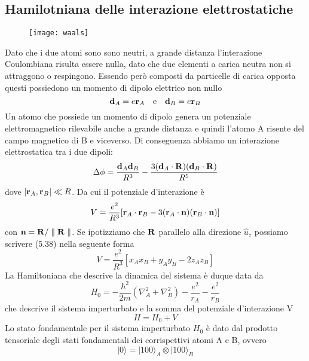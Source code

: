 \subsection{Hamilotniana delle interazione elettrostatiche}

\begin{wrapfigure}{r}{0.5\textwidth} %
    \centering
    \texttt{[image: waals]} %
\end{wrapfigure}

Dato che i due atomi sono sono neutri, a grande distanza l'interazione Coulombiana risulta essere nulla, dato che due elementi a carica neutra non si attraggono o respingono. Essendo per\`o composti da  particelle di carica opposta questi possiedono un momento di dipolo elettrico non nullo
\begin{equation*}
	\bold{d}_{A} = e\bold{r}_{A} \quad \text{e} \quad \bold{d}_{B} = e\bold{r}_{B}
\end{equation*}
Un atomo che possiede un momento di dipolo genera un potenziale elettromagnetico rilevabile anche a grande distanza e quindi l'atomo A risente del campo magnetico di B e viceverso. Di conseguenza abbiamo un interazione elettrostatica tra i due dipoli:
\begin{equation*}
	\Delta \phi = \frac{\bold{d}_{A} \bold{d}_{B}}{R^3} - \frac{3(\bold{d}_{A} \cdot \bold{R})(\bold{d}_{B} \cdot \bold{R})}{R^5}
\end{equation*}
dove $|\bold{r}_{A}, \bold{r}_{B}| \ll R$. Da cui il potenziale d'interazione \`e 
\begin{equation}
	V = \frac{e^2}{R^3}[\bold{r}_{A} \cdot \bold{r}_{B} - 3 (\bold{r}_{A} \cdot \bold{n})(\bold{r}_{B} \cdot \bold{n})]
\end{equation}
con $\bold{n} = \bold{R}/\parallel \bold{R}\parallel $. Se ipotizziamo che $\bold{R}$  parallelo alla direzione $\hat{u}_{z} $ possiamo scrivere (5.38) nella seguente forma
\begin{equation*}
	V = \frac{e^2}{R^3}[x_{A}x_{B} + y_{A}y_{B} -2z_{A}z_{B}]
\end{equation*}
La Hamiltoniana che descrive la dinamica del sistema \`e duque data da 
\begin{equation*}
	H_0 = - \frac{\hbar^2}{2m}(\nabla_{A}^2 + \nabla_{B}^2) - \frac{e^2}{r_{A}} - \frac{e^2}{r_{B}}
\end{equation*}
che descrive il sistema imperturbato e la somma del potenziale d'interazione V
\begin{equation*}
	H = H_0 + V
\end{equation*}
Lo stato fondamentale per il sistema imperturbato $H_0$ \`e dato dal prodotto tensoriale degli stati fondamentali dei corrispettivi atomi A e B, ovvero
\begin{equation*}
	|0 \rangle  = |100 \rangle_{A} \otimes |100 \rangle_{B}
\end{equation*}
\newpage 
